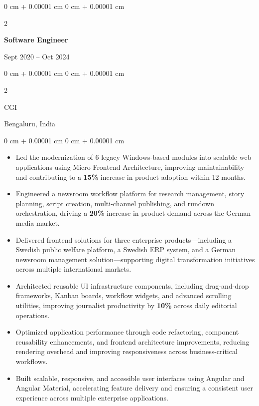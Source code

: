 \documentclass[10pt, letterpaper]{article}
\newenvironment{highlights}{
    \begin{itemize}[
        topsep=0.10 cm,
        parsep=0.10 cm,
        partopsep=0pt,
        itemsep=0pt,
        leftmargin=0 cm + 10pt
    ]
}{
    \end{itemize}
} %
\newenvironment{onecolentry}{
    \begin{adjustwidth}{
        0 cm + 0.00001 cm
    }{
        0 cm + 0.00001 cm
    }
}{
    \end{adjustwidth}
} %
\newenvironment{twocolentry}[2][]{
    \onecolentry
    \def\secondColumn{#2}
    \setcolumnwidth{\fill, 4.5 cm}
    \begin{paracol}{2}
}{
    \switchcolumn \raggedleft \secondColumn
    \end{paracol}
    \endonecolentry
} %
\begin{document}
        \begin{twocolentry}
            {Sept 2020 – Oct 2024}
            \textbf{Software Engineer} 
        \end{twocolentry}
            \begin{twocolentry}
            {Bengaluru, India} 
            {CGI} 
        \end{twocolentry}
        \vspace{0.10 cm}
        \begin{onecolentry}
            \begin{highlights}
                \item Led the modernization of 6 legacy Windows-based modules into scalable web applications using Micro Frontend Architecture, improving maintainability and contributing to a \textbf{15\%} increase in product adoption within 12 months.
                
                \item Engineered a newsroom workflow platform for research management, story planning, script creation, multi-channel publishing, and rundown orchestration, driving a \textbf{20\%} increase in product demand across the German media market.
                
                \item Delivered frontend solutions for three enterprise products—including a Swedish public welfare platform, a Swedish ERP system, and a German newsroom management solution—supporting digital transformation initiatives across multiple international markets.

                \item Architected reusable UI infrastructure components, including drag-and-drop frameworks, Kanban boards, workflow widgets, and advanced scrolling utilities, improving journalist productivity by \textbf{10\%} across daily editorial operations.

                \item Optimized application performance through code refactoring, component reusability enhancements, and frontend architecture improvements, reducing rendering overhead and improving responsiveness across business-critical workflows.

                \item Built scalable, responsive, and accessible user interfaces using Angular and Angular Material, accelerating feature delivery and ensuring a consistent user experience across multiple enterprise applications.


\end{highlights}
\end{onecolentry}
\end{document}
